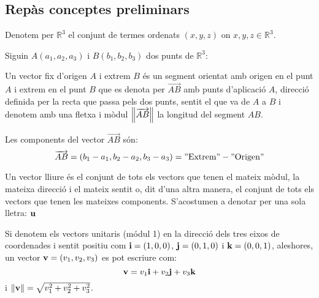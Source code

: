 \documentclass{beamer}
\begin{document}
\subsection{Repàs conceptes preliminars}
\begin{frame}[allowframebreaks]
  Denotem per $\mathbb{R}^3$ el conjunt de termes ordenats $(x,y,z)$ on $x,y,z \in \mathbb{R}^3$.

  Siguin $A(a_1,a_2,a_3)$ i $B(b_1,b_2,b_3)$ dos punts de $\mathbb{R}^3$:
  \begin{definicio}
    Un vector fix d'origen $A$ i extrem $B$ és un segment orientat amb origen en el punt $A$ i extrem en el punt $B$ que es denota per $\overrightarrow{AB}$ amb punts d'aplicació $A$, direcció definida per la recta que passa pels dos punts, sentit el que va de $A$ a $B$ i denotem amb una fletxa i mòdul $\norm{\overrightarrow{AB}}$ la longitud del segment $AB$.
  \end{definicio}
  Les components del vector $\overrightarrow{AB}$ són:
  \[
    \overrightarrow{AB}=(b_1-a_1,b_2-a_2,b_3-a_3)=\mathrm{"Extrem"}-\mathrm{"Origen"}
  \]
  \begin{definicio}
    Un vector lliure és el conjunt de tots els vectors que tenen el mateix mòdul, la mateixa direcció i el mateix sentit o, dit d'una altra manera, el conjunt de tots els vectors que tenen les mateixes components. S'acostumen a denotar per una sola lletra: $\textbf{u}$ 
  \end{definicio}
  Si denotem els vectors unitaris (módul 1) en la direcció dels tres eixos de coordenades i sentit positiu com $\textbf{i}=(1,0,0)$, $\textbf{j}=(0,1,0)$ i $\textbf{k}=(0,0,1)$, aleshores, un vector $\textbf{v}=(v_1,v_2,v_3)$ es pot escriure com:
  \[
    \textbf{v}=v_1 \textbf{i}+v_2 \textbf{j} + v_3 \textbf{k}
  \]
  i $\norm{\textbf{v}} = \sqrt{v_1^2+v_2^2+v_3^2}$.
\end{frame}
\end{document}

